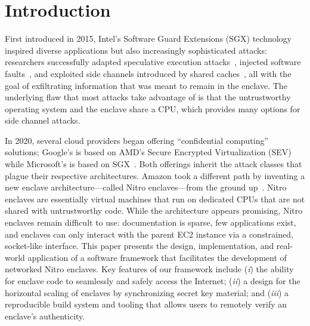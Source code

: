 \section{Introduction}

First introduced in 2015, Intel's Software Guard Extensions (SGX) technology
inspired diverse applications but also increasingly sophisticated attacks:
researchers successfully adapted speculative execution
attacks~\cite{VanBulck2018a}, injected software faults~\cite{Murdock2020a}, and
exploited side channels introduced by shared caches~\cite{Brasser2017a}, all
with the goal of exfiltrating information that was meant to remain in the
enclave.  The underlying flaw that most attacks take advantage of is that the
untrustworthy operating system and the enclave share a CPU, which provides many
options for side channel attacks.

In 2020, several cloud providers began offering ``confidential computing''
solutions; Google's is based on AMD's Secure Encrypted Virtualization
(SEV)~\cite{googlecc} while Microsoft's is based on SGX~\cite{azurecc}.  Both
offerings inherit the attack classes that plague their respective architectures.
Amazon took a different path by inventing a new enclave architecture---called
Nitro enclaves---from the ground up~\cite{nitro-enclaves}.  Nitro enclaves are
essentially virtual machines that run on dedicated CPUs that are not shared with
untrustworthy code.  While the architecture appears promising, Nitro enclaves
remain difficult to use: documentation is sparse, few applications exist, and
enclaves can only interact with the parent EC2 instance via a constrained,
socket-like interface.  This paper presents the design, implementation, and
real-world application of a software framework that facilitates the development
of networked Nitro enclaves.  Key features of our framework include
(\emph{i}) the ability for enclave code to seamlessly and safely access the
Internet;
(\emph{ii}) a design for the horizontal scaling of enclaves by synchronizing
secret key material; and
(\emph{iii}) a reproducible build system and tooling that allows users to
remotely verify an enclave's authenticity.

